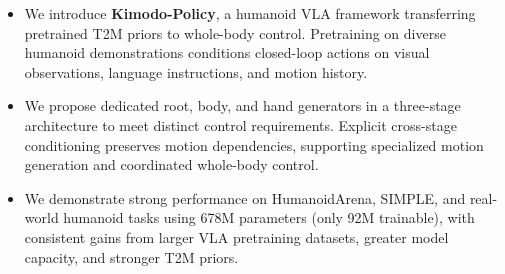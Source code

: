 \documentclass{article}
\begin{document}
\par\bigskip
\begin{itemize}
\item We introduce \textbf{Kimodo-Policy}, a humanoid VLA framework transferring pretrained T2M priors to whole-body control. Pretraining on diverse humanoid demonstrations conditions closed-loop actions on visual observations, language instructions, and motion history.
\item We propose dedicated root, body, and hand generators in a three-stage architecture to meet distinct control requirements. Explicit cross-stage conditioning preserves motion dependencies, supporting specialized motion generation and coordinated whole-body control.
\item We demonstrate strong performance on HumanoidArena, SIMPLE, and real-world humanoid tasks using 678M parameters (only 92M trainable), with consistent gains from larger VLA pretraining datasets, greater model capacity, and stronger T2M priors.
\end{itemize}
\end{document}
